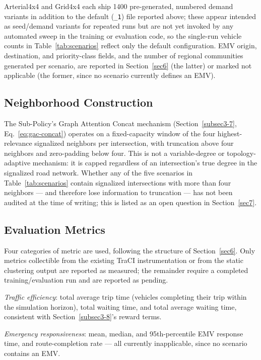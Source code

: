 \documentclass[3p,times]{elsarticle}
\theoremstyle{plain}
\theoremstyle{definition}
\begin{document}
Arterial4x4 and Grid4x4 each ship 1400 pre-generated, numbered demand
variants in addition to the default (\texttt{\_1}) file reported above;
these appear intended as seed/demand variants for repeated runs but are
not yet invoked by any automated sweep in the training or evaluation
code, so the single-run vehicle counts in Table~\ref{tab:scenarios}
reflect only the default configuration. EMV origin, destination, and
priority-class fields, and the number of regional communities generated
per scenario, are reported in Section~\ref{sec6} (the latter) or marked
not applicable (the former, since no scenario currently defines an EMV).

\subsection{Neighborhood Construction}\label{subsec5-3}

The Sub-Policy's Graph Attention Concat mechanism (Section~\ref{subsec3-7},
Eq.~\eqref{eq:gac-concat}) operates on a fixed-capacity window of the
four highest-relevance signalized neighbors per intersection, with
truncation above four neighbors and zero-padding below four. This is
not a variable-degree or topology-adaptive mechanism: it is capped
regardless of an intersection's true degree in the signalized road
network. Whether any of the five scenarios in
Table~\ref{tab:scenarios} contain signalized intersections with more
than four neighbors --- and therefore lose information to truncation
--- has not been audited at the time of writing; this is listed as an
open question in Section~\ref{sec7}.

\subsection{Evaluation Metrics}\label{subsec5-4}

Four categories of metric are used, following the structure of
Section~\ref{sec6}. Only metrics collectible from the existing TraCI
instrumentation or from the static clustering output are reported as
measured; the remainder require a completed training/evaluation run
and are reported as pending.

\textit{Traffic efficiency}: total average trip time (vehicles
completing their trip within the simulation horizon), total waiting
time, and total average waiting time, consistent with
Section~\ref{subsec3-8}'s reward terms.

\textit{Emergency responsiveness}: mean, median, and 95th-percentile
EMV response time, and route-completion rate --- all currently
inapplicable, since no scenario contains an EMV.
\end{document}
